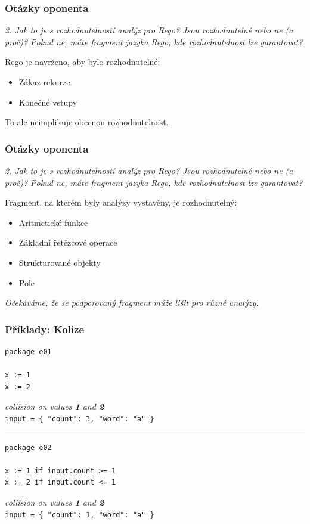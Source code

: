 \begin{frame}
  \frametitle{Otázky oponenta}
  \textit{2. Jak to je s rozhodnutelností analýz pro Rego? Jsou rozhodnutelné nebo ne (a proč)? Pokud ne, máte fragment jazyka Rego, kde rozhodnutelnost lze garantovat?}
  \bigskip

  Rego je navrženo, aby bylo rozhodnutelné:
  \begin{itemize}
    \item Zákaz rekurze
    \item Konečné vstupy
  \end{itemize}
  To ale neimplikuje obecnou rozhodnutelnost.
\end{frame}

\begin{frame}
  \frametitle{Otázky oponenta}
  \textit{2. Jak to je s rozhodnutelností analýz pro Rego? Jsou rozhodnutelné nebo ne (a proč)? Pokud ne, máte fragment jazyka Rego, kde rozhodnutelnost lze garantovat?}
  \bigskip

  Fragment, na kterém byly analýzy vystavěny, je rozhodnutelný:
  \begin{itemize}
    \item Aritmetické funkce
    \item Základní řetězcové operace
    \item Strukturované objekty
    \item Pole
  \end{itemize}
  \bigskip

  \small\textit{Očekáváme, že se podporovaný fragment může lišit pro různé analýzy.}
\end{frame}


\begin{frame}[fragile]
  \frametitle{Příklady: Kolize}
  \begin{lstlisting}[language=Rego, basicstyle=\ttfamily\small]
package e01

x := 1
x := 2
  \end{lstlisting}
  \textit{collision on values \textbf{1} and \textbf{2}} \\
  \texttt{input = \{ "count": 3, "word": "a" \}}

  \noindent\rule{\linewidth}{0.4pt}
  \begin{lstlisting}[language=Rego, basicstyle=\ttfamily\small]
package e02

x := 1 if input.count >= 1
x := 2 if input.count <= 1
  \end{lstlisting}
  \textit{collision on values \textbf{1} and \textbf{2}} \\
  \texttt{input = \{ "count": 1, "word": "a" \}}
\end{frame}

